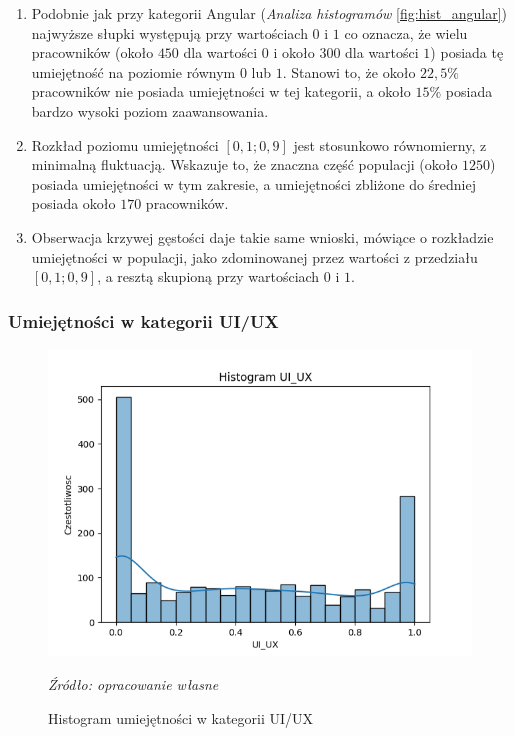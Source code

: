         \begin{enumerate}
            \item Podobnie jak przy kategorii Angular (\textit{Analiza histogramów} \ref{fig:hist_angular}) najwyższe słupki występują przy wartościach $0$ i $1$ co oznacza, że wielu pracowników (około $450$ dla wartości $0$ i około $300$ dla wartości $1$) posiada tę umiejętność na poziomie równym $0$ lub $1$. Stanowi to, że około $22,5\%$ pracowników nie posiada umiejętności w tej kategorii, a około $15\%$ posiada bardzo wysoki poziom zaawansowania.
            \item Rozkład poziomu umiejętności $[0,1; 0,9]$ jest stosunkowo równomierny, z minimalną fluktuacją. Wskazuje to, że znaczna część populacji (około $1250$) posiada umiejętności w tym zakresie, a umiejętności zbliżone do średniej posiada około $170$ pracowników.
            \item Obserwacja krzywej gęstości daje takie same wnioski, mówiące o rozkładzie umiejętności w populacji, jako zdominowanej przez wartości z przedziału $[0,1; 0,9]$, a resztą skupioną przy wartościach $0$ i $1$.
        \end{enumerate}
        
        \subsubsection{Umiejętności w kategorii UI/UX}
        \begin{figure}[H]
            \centering
            \includegraphics[width=\linewidth]{chapters/Images/hist_uiux.png}
            \cprotect\caption{Histogram umiejętności w kategorii UI/UX}
            \textit{Źródło: opracowanie własne} 
            \label{fig:hist_uiux}
        \end{figure}


